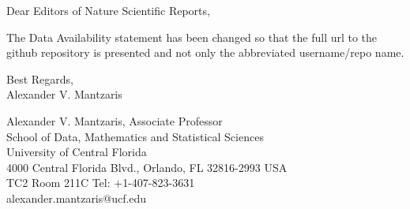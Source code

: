 \documentclass{article}
\begin{document}
\noindent Dear Editors of Nature Scientific Reports,
\vspace{.5cm}

\indent The Data Availability statement has been changed so that the full url to the github repository is presented and not only the abbreviated username/repo name.

\vspace{.5cm}

\noindent Best Regards,\\
Alexander V. Mantzaris

\vspace{.5cm}

\noindent Alexander V. Mantzaris, Associate Professor \\
School of Data, Mathematics and Statistical Sciences\\
University of Central Florida\\
4000 Central Florida Blvd., Orlando, FL 32816-2993 USA\\
TC2 Room 211C Tel: +1-407-823-3631 \\
alexander.mantzaris@ucf.edu
\end{document}

